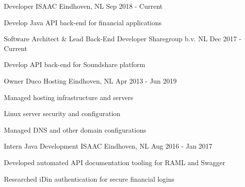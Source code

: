 \vspace{2mm}

\begin{cventries}
\cventry
  {Developer}
  {ISAAC}
  {Eindhoven, NL}
  {Sep 2018 - Current}
  {
    \begin{cvitems}
      \item {Develop Java API back-end for financial applications}
    \end{cvitems}
  }
  \vspace{4mm}

\cventry
  {Software Architect \& Lead Back-End Developer} %
  {Sharegroup b.v.} %
  {NL} %
  {Dec 2017 - Current} %
  {
    \begin{cvitems} %
      \item {Develop API back-end for Soundshare platform}
    \end{cvitems}
  }
  \vspace{4mm}
  
\cventry
  {Owner} %
  {Duco Hosting} %
  {Eindhoven, NL} %
  {Apr 2013 - Jun 2019} %
  {
    \begin{cvitems} %
      \item {Managed hosting infrastructure and servers}
      \item {Linux server security and configuration}
      \item {Managed DNS and other domain configurations}
    \end{cvitems}
  }
  \vspace{4mm}

  \cventry
    {Intern Java Development} %
    {ISAAC} %
    {Eindhoven, NL} %
    {Aug 2016 - Jan 2017} %
    {
      \begin{cvitems} %
        \item {Developed automated API documentation tooling for RAML and Swagger}
        \item {Researched iDin authentication for secure financial logins}
      \end{cvitems}
    }
    \vspace{4mm}


\end{cventries}
